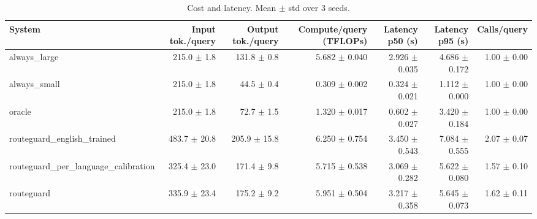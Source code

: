 \begin{table}[t]
\centering
\small
\caption{Cost and latency. Mean $\pm$ std over 3 seeds.}
\label{tab:efficiency}
\begin{tabular}{lrrrrrr}
\toprule
System & Input tok./query & Output tok./query & Compute/query (TFLOPs) & Latency p50 (s) & Latency p95 (s) & Calls/query \\
\midrule
always\_large & 215.0 $\pm$ 1.8 & 131.8 $\pm$ 0.8 & 5.682 $\pm$ 0.040 & 2.926 $\pm$ 0.035 & 4.686 $\pm$ 0.172 & 1.00 $\pm$ 0.00 \\
always\_small & 215.0 $\pm$ 1.8 & 44.5 $\pm$ 0.4 & 0.309 $\pm$ 0.002 & 0.324 $\pm$ 0.021 & 1.112 $\pm$ 0.000 & 1.00 $\pm$ 0.00 \\
oracle & 215.0 $\pm$ 1.8 & 72.7 $\pm$ 1.5 & 1.320 $\pm$ 0.017 & 0.602 $\pm$ 0.027 & 3.420 $\pm$ 0.184 & 1.00 $\pm$ 0.00 \\
routeguard\_english\_trained & 483.7 $\pm$ 20.8 & 205.9 $\pm$ 15.8 & 6.250 $\pm$ 0.754 & 3.450 $\pm$ 0.543 & 7.084 $\pm$ 0.555 & 2.07 $\pm$ 0.07 \\
routeguard\_per\_language\_calibration & 325.4 $\pm$ 23.0 & 171.4 $\pm$ 9.8 & 5.715 $\pm$ 0.538 & 3.069 $\pm$ 0.282 & 5.622 $\pm$ 0.080 & 1.57 $\pm$ 0.10 \\
routeguard & 335.9 $\pm$ 23.4 & 175.2 $\pm$ 9.2 & 5.951 $\pm$ 0.504 & 3.217 $\pm$ 0.358 & 5.645 $\pm$ 0.073 & 1.62 $\pm$ 0.11 \\
\bottomrule
\end{tabular}
\end{table}
